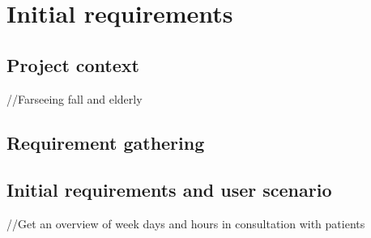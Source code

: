 \chapter{Initial requirements}


\section{Project context}
//Farseeing fall and elderly

\section{Requirement gathering}

\section{Initial requirements and user scenario}
//Get an overview of week days and hours in consultation with patients